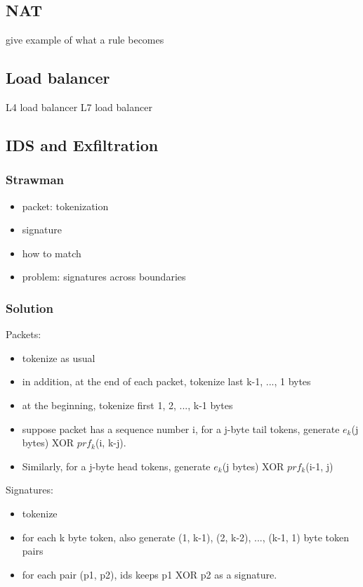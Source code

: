 \subsection{NAT}\label{sec:nat}

give example of what a rule becomes

\subsection{Load balancer}\label{sec:loadb}

L4 load balancer
L7 load balancer

\subsection{IDS and Exfiltration}\label{sec:IDS}
\subsubsection{Strawman}
\begin{itemize}
\item packet: tokenization
\item signature
\item how to match
\item problem: signatures across boundaries
\end{itemize}

\subsubsection{Solution}
Packets:
\begin{itemize}
\item tokenize as usual
\item in addition, at the end of each packet, tokenize last k-1, ..., 1 bytes
\item at the beginning, tokenize first 1, 2, ..., k-1 bytes
\item suppose packet has a sequence number i, for a j-byte tail tokens, generate $e_k$(j bytes) XOR $prf_k$(i, k-j).
\item Similarly, for a j-byte head tokens, generate $e_k$(j bytes) XOR $prf_k$(i-1, j)
\end{itemize}

Signatures:
\begin{itemize}
\item tokenize
\item for each k byte token, also generate (1, k-1), (2, k-2), ..., (k-1, 1) byte token pairs
\item for each pair (p1, p2), ids keeps p1 XOR p2 as a signature.
\end{itemize}

